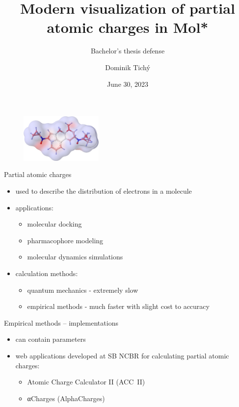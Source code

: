 \documentclass[
]{beamer}
\title[Modern visualization of partial atomic charges in Mol*]{Modern visualization of partial atomic charges in Mol*}
\subtitle[Short Presentation Subtitle]{Bachelor's thesis defense}
\author[Dominik Tichý]{Dominik Tichý}
\institute[FI MU]{Faculty of Informatics, Masaryk University}
\date{June 30, 2023}
\begin{document}
\begin{frame}[plain]
\maketitle
\end{frame}

\begin{figure}
  \vspace{65pt}
  \hspace{25pt}
  \includegraphics[height=2.4cm]{images/1cp-lsd.png}
\end{figure}

\begin{frame}{Partial atomic charges}
  \begin{itemize}
    \item used to describe the distribution of electrons in a molecule
    \item applications:
    \begin{itemize}
      \item molecular docking
      \item pharmacophore modeling
      \item molecular dynamics simulations
    \end{itemize}
      \item calculation methods:
    \begin{itemize}
      \item quantum mechanics - extremely slow
      \item empirical methods - much faster with slight cost to accuracy
    \end{itemize}
  \end{itemize}
\end{frame}

\begin{frame}{Empirical methods -- implementations}
  \begin{itemize}
    \item can contain parameters
    \item web applications developed at SB NCBR for calculating partial atomic charges:
    \begin{itemize}
      \item Atomic Charge Calculator II (ACC~II) 
      \item αCharges (AlphaCharges)
    \end{itemize}
  \end{itemize}
\end{frame}
\end{document}
